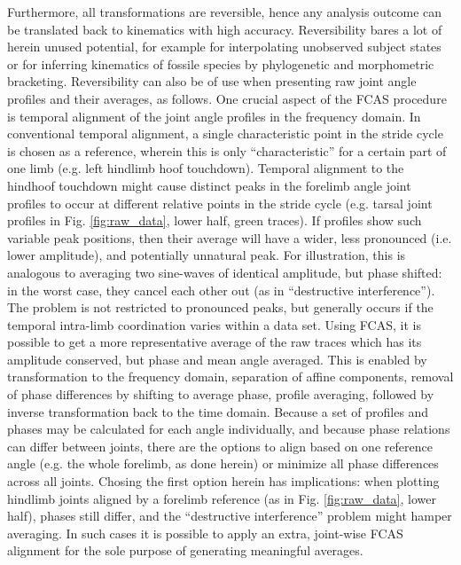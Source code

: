 Furthermore, all transformations are reversible, hence any analysis outcome can be translated back to kinematics with high accuracy.
Reversibility bares a lot of herein unused potential, for example for interpolating unobserved subject states or for inferring kinematics of fossile species by phylogenetic and morphometric bracketing.
Reversibility can also be of use when presenting raw joint angle profiles and their averages, as follows.
One crucial aspect of the FCAS procedure is temporal alignment of the joint angle profiles in the frequency domain.
In conventional temporal alignment, a single characteristic point in the stride cycle is chosen as a reference, wherein this is only ``characteristic'' for a certain part of one limb (e.g. left hindlimb hoof touchdown).
Temporal alignment to the hindhoof touchdown might cause distinct peaks in the forelimb angle joint profiles to occur at different relative points in the stride cycle (e.g. tarsal joint profiles in Fig. \ref{fig:raw_data}, lower half, green traces).
If profiles show such variable peak positions, then their average will have a wider, less pronounced (i.e. lower amplitude), and potentially unnatural peak.
For illustration, this is analogous to averaging two sine-waves of identical amplitude, but phase shifted: in the worst case, they cancel each other out (as in ``destructive interference'').
The problem is not restricted to pronounced peaks, but generally occurs if the temporal intra-limb coordination varies within a data set.
Using FCAS, it is possible to get a more representative average of the raw traces which has its amplitude conserved, but phase and mean  angle averaged.
This is enabled by transformation to the frequency domain, separation of affine components, removal of phase differences by shifting to average phase, profile averaging, followed by inverse transformation back to the time domain.
Because a set of profiles and phases may be calculated for each  angle individually, and because phase relations can differ between joints, there are the options to align based on one reference angle (e.g. the whole forelimb, as done herein) or minimize all phase differences across all joints.
Chosing the first option herein has implications: when plotting hindlimb joints aligned by a forelimb reference (as in Fig. \ref{fig:raw_data}, lower half), phases still differ, and the ``destructive interference'' problem might hamper averaging.
In such cases it is possible to apply an extra, joint-wise FCAS alignment for the sole purpose of generating meaningful averages.




